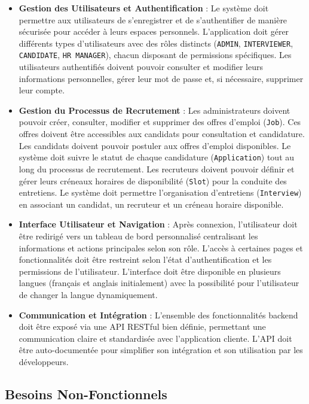 \begin{itemize}
    \item \textbf{Gestion des Utilisateurs et Authentification} : Le système doit permettre aux utilisateurs de s'enregistrer et de s'authentifier de manière sécurisée pour accéder à leurs espaces personnels. L'application doit gérer différents types d'utilisateurs avec des rôles distincts (\texttt{ADMIN}, \texttt{INTERVIEWER}, \texttt{CANDIDATE}, \texttt{HR MANAGER}), chacun disposant de permissions spécifiques. Les utilisateurs authentifiés doivent pouvoir consulter et modifier leurs informations personnelles, gérer leur mot de passe et, si nécessaire, supprimer leur compte.

    \item \textbf{Gestion du Processus de Recrutement} : Les administrateurs doivent pouvoir créer, consulter, modifier et supprimer des offres d'emploi (\texttt{Job}). Ces offres doivent être accessibles aux candidats pour consultation et candidature. Les candidats doivent pouvoir postuler aux offres d'emploi disponibles. Le système doit suivre le statut de chaque candidature (\texttt{Application}) tout au long du processus de recrutement. Les recruteurs doivent pouvoir définir et gérer leurs créneaux horaires de disponibilité (\texttt{Slot}) pour la conduite des entretiens. Le système doit permettre l'organisation d'entretiens (\texttt{Interview}) en associant un candidat, un recruteur et un créneau horaire disponible.

    \item \textbf{Interface Utilisateur et Navigation} : Après connexion, l'utilisateur doit être redirigé vers un tableau de bord personnalisé centralisant les informations et actions principales selon son rôle. L'accès à certaines pages et fonctionnalités doit être restreint selon l'état d'authentification et les permissions de l'utilisateur. L'interface doit être disponible en plusieurs langues (français et anglais initialement) avec la possibilité pour l'utilisateur de changer la langue dynamiquement.

    \item \textbf{Communication et Intégration} : L'ensemble des fonctionnalités backend doit être exposé via une API RESTful bien définie, permettant une communication claire et standardisée avec l'application cliente. L'API doit être auto-documentée pour simplifier son intégration et son utilisation par les développeurs.
\end{itemize}

\subsection{Besoins Non-Fonctionnels}

